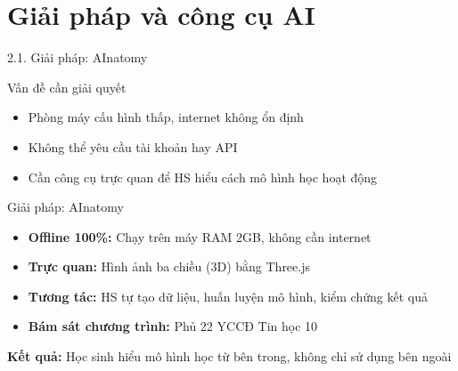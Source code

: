 \documentclass[10pt, aspectratio=169]{beamer}
\begin{document}
\section{Giải pháp và công cụ AI}

\begin{frame}{2.1. Giải pháp: AInatomy}
    \begin{block}{Vấn đề cần giải quyết}
        \begin{itemize}
            \item Phòng máy cấu hình thấp, internet không ổn định
            \item Không thể yêu cầu tài khoản hay API
            \item Cần công cụ trực quan để HS hiểu cách mô hình học hoạt động
        \end{itemize}
    \end{block}
    
    \vspace{0.2em}
    
    \begin{block}{Giải pháp: AInatomy}
        \begin{itemize}
            \item \textbf{Offline 100\%:} Chạy trên máy RAM 2GB, không cần internet
            \item \textbf{Trực quan:} Hình ảnh ba chiều (3D) bằng Three.js
            \item \textbf{Tương tác:} HS tự tạo dữ liệu, huấn luyện mô hình, kiểm chứng kết quả
            \item \textbf{Bám sát chương trình:} Phủ 22 YCCĐ Tin học 10
        \end{itemize}
    \end{block}
    
    \vspace{0.2em}
    
    {\centering\small\textbf{Kết quả:} Học sinh hiểu mô hình học từ bên trong, không chỉ sử dụng bên ngoài\par}
\end{frame}
\end{document}

